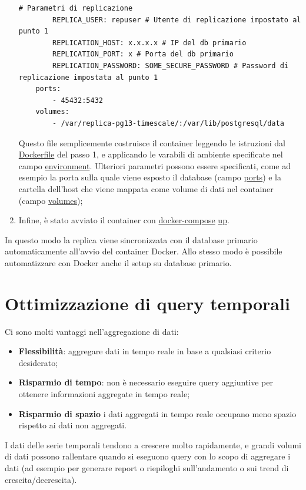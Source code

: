 \begin{enumerate}
\begin{lstlisting}[]
        # Parametri di replicazione
        REPLICA_USER: repuser # Utente di replicazione impostato al punto 1
        REPLICATION_HOST: x.x.x.x # IP del db primario
        REPLICATION_PORT: x # Porta del db primario
        REPLICATION_PASSWORD: SOME_SECURE_PASSWORD # Password di replicazione impostata al punto 1
    ports:
        - 45432:5432
    volumes:
        - /var/replica-pg13-timescale/:/var/lib/postgresql/data
\end{lstlisting}
Questo file semplicemente costruisce il container leggendo le istruzioni dal \url{Dockerfile} del passo 1, e applicando le varabili di ambiente specificate nel campo \url{environment}. Ulteriori parametri possono essere specificati, come ad esempio la porta sulla quale viene esposto il database (campo \url{ports}) e la cartella dell'host che viene mappata come volume di dati nel container (campo \url{volumes});
  \item Infine, è stato avviato il container con \url{docker-compose} \url{up}.
\end{enumerate}

In questo modo la replica viene sincronizzata con il database primario automaticamente all'avvio del container Docker.
Allo stesso modo è possibile automatizzare con Docker anche il setup su database primario.

\section{Ottimizzazione di query temporali}\label{sec:cont-aggr}
Ci sono molti vantaggi nell'aggregazione di dati:
\begin{itemize}
  \item \textbf{Flessibilità}: aggregare dati in tempo reale in base a qualsiasi criterio desiderato;
  \item \textbf{Risparmio di tempo}: non è necessario eseguire query aggiuntive per ottenere informazioni aggregate in tempo reale;
  \item \textbf{Risparmio di spazio} i dati aggregati in tempo reale occupano meno spazio rispetto ai dati non aggregati.
\end{itemize}

I dati delle serie temporali tendono a crescere molto rapidamente, e grandi volumi di dati possono rallentare quando si eseguono query con lo scopo di aggregare i dati (ad esempio per generare report o riepiloghi sull'andamento o sui trend di crescita/decrescita).

